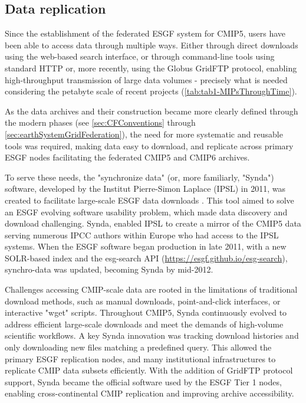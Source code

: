 \documentclass[manuscript]{copernicus}
\newcommand{\mycomment}[1]{}
\def\cred#1{{\color{red}#1}}
\begin{document}
\mycomment{
https://www.ipcc-data.org/sim/gcm_monthly/AR5/WG1-Archive.html
https://www.wdc-climate.de/ui/statistics?type=cmip6_doi_registration
https://commons.datacite.org/repositories/8orcv25 - Master overview 6720 citations
https://www.wdc-climate.de/ords/f?p=127:2 - CMIP6 data references
https://www.wdc-climate.de/ui/cmip6?input=CMIP6.ScenarioMIP.NOAA-GFDL.GFDL-CM4.ssp585
https://www.wdc-climate.de/ui/cmip6?input=input4MIPs.CMIP6.CMIP.PCMDI
}


\subsection{Data replication}
\label{sec:CMIPDataReplication}

Since the establishment of the federated ESGF system for CMIP5, users have been able to access data through multiple ways. Either through direct downloads using the web-based search interface, or through command-line tools using standard HTTP or, more recently, using the Globus GridFTP protocol, enabling high-throughput transmission of large data volumes - precisely what is needed considering the petabyte scale of recent projects (\autoref{tab:tab1-MIPsThroughTime}).

As the data archives and their construction became more clearly defined through the modern phases (see \autoref{sec:CFConventions} through \autoref{sec:earthSystemGridFederation}), the need for more systematic and reusable tools was required, making data easy to download, and replicate across primary ESGF nodes facilitating the federated CMIP5 and CMIP6 archives.

To serve these needs, the "synchronize data" (or, more familiarly, "Synda") software, developed by the Institut Pierre-Simon Laplace (IPSL) in 2011, was created to facilitate large-scale ESGF data downloads \citep{denvil_synchronize_2020}. This tool aimed to solve an ESGF evolving software usability problem, which made data discovery and download challenging. Synda, enabled IPSL to create a mirror of the CMIP5 data serving numerous IPCC authors within Europe who had access to the IPSL systems. When the ESGF software began production in late 2011, with a new SOLR-based index and the esg-search API (\url{https://esgf.github.io/esg-search}), synchro-data was updated, becoming Synda by mid-2012.

Challenges accessing CMIP-scale data are rooted in the limitations of traditional download methods, such as manual downloads, point-and-click interfaces, or interactive "wget" scripts. Throughout CMIP5, Synda continuously evolved to address efficient large-scale downloads and meet the demands of high-volume scientific workflows. A key Synda innovation was tracking download histories and only downloading new files matching a predefined query. This allowed the primary ESGF replication nodes, and many institutional infrastructures to replicate CMIP data subsets efficiently. With the addition of GridFTP protocol support, Synda became the official software used by the ESGF Tier 1 nodes, enabling cross-continental CMIP replication and improving archive accessibility.
\end{document}
